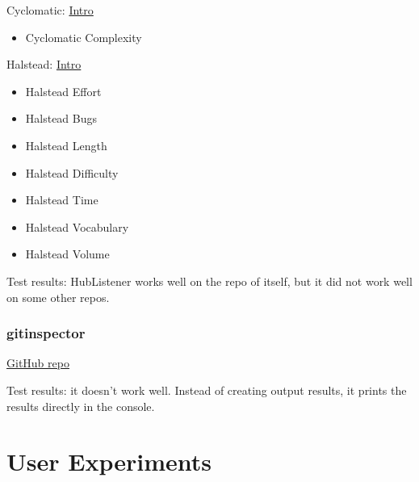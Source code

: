 \documentclass[letterpaper,cleveref]{lipics-v2019}
\theoremstyle{definition}
\begin{document}
Cyclomatic:
\href{https://www.geeksforgeeks.org/cyclomatic-complexity/}{Intro}
\begin{itemize}
\item Cyclomatic Complexity
\end{itemize}
 
Halstead:
\href{https://www.geeksforgeeks.org/software-engineering-halsteads-software-metrics/}{Intro}
\begin{itemize}
\item Halstead Effort
\item Halstead Bugs
\item Halstead Length
\item Halstead Difficulty
\item Halstead Time
\item Halstead Vocabulary
\item Halstead Volume
\end{itemize}

Test results: HubListener works well on the repo of itself, but it did not work
well on some other repos.

\subsubsection{gitinspector}
\href{https://github.com/ejwa/gitinspector}{GitHub repo}

Test results: it doesn't work well. Instead of creating output results, it
prints the results directly in the console.

\section{User Experiments}
\end{document}
